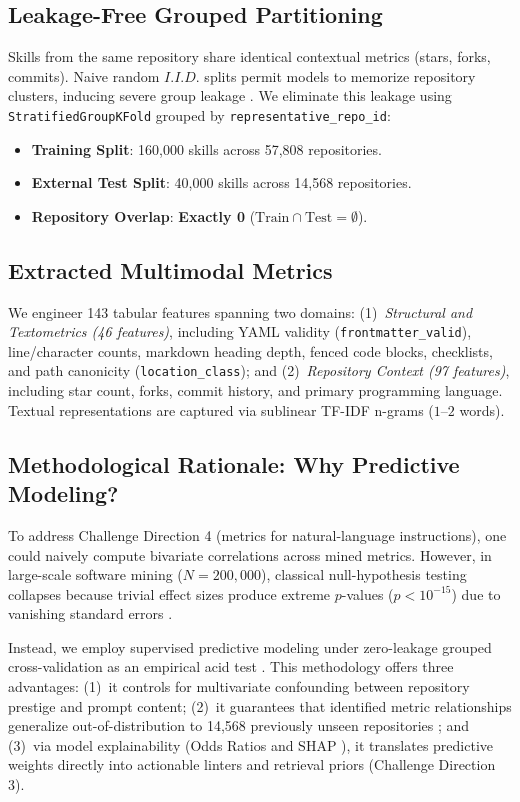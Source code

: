 \documentclass[10pt,conference]{IEEEtran}
\begin{document}
\subsection{Leakage-Free Grouped Partitioning}
Skills from the same repository share identical contextual metrics (stars, forks, commits). Naive random $I.I.D.$ splits permit models to memorize repository clusters, inducing severe group leakage \cite{saeb2017need,kaufman2012leakage,roberts2017cross}. We eliminate this leakage using \texttt{StratifiedGroupKFold} grouped by \texttt{representative\_repo\_id}:
\begin{itemize}
    \item \textbf{Training Split}: 160,000 skills across 57,808 repositories.
    \item \textbf{External Test Split}: 40,000 skills across 14,568 repositories.
    \item \textbf{Repository Overlap}: \textbf{Exactly 0} ($\text{Train} \cap \text{Test} = \emptyset$).
\end{itemize}

\subsection{Extracted Multimodal Metrics}
We engineer 143 tabular features spanning two domains: (1)~\emph{Structural and Textometrics (46 features)}, including YAML validity (\texttt{frontmatter\_valid}), line/character counts, markdown heading depth, fenced code blocks, checklists, and path canonicity (\texttt{location\_class}); and (2)~\emph{Repository Context (97 features)}, including star count, forks, commit history, and primary programming language. Textual representations are captured via sublinear TF-IDF n-grams ($1$--$2$ words).

\subsection{Methodological Rationale: Why Predictive Modeling?}
To address Challenge Direction 4 (metrics for natural-language instructions), one could naively compute bivariate correlations across mined metrics. However, in large-scale software mining ($N=200,000$), classical null-hypothesis testing collapses because trivial effect sizes produce extreme $p$-values ($p < 10^{-15}$) due to vanishing standard errors \cite{lin2013too}. 

Instead, we employ supervised predictive modeling under zero-leakage grouped cross-validation as an empirical acid test \cite{shmueli2010explain,breiman2001statistical}. This methodology offers three advantages: (1)~it controls for multivariate confounding between repository prestige and prompt content; (2)~it guarantees that identified metric relationships generalize out-of-distribution to 14,568 previously unseen repositories \cite{roberts2017cross}; and (3)~via model explainability (Odds Ratios and SHAP \cite{lundberg2017unified}), it translates predictive weights directly into actionable linters and retrieval priors (Challenge Direction 3).
\end{document}
